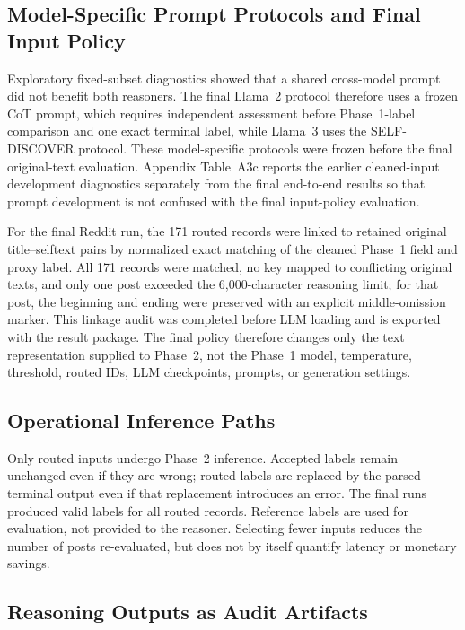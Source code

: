 \documentclass{ieeeaccess}
\begin{document}
\subsection{Model-Specific Prompt Protocols and Final Input Policy}

Exploratory fixed-subset diagnostics showed that a shared cross-model prompt did not benefit both reasoners. The final Llama~2 protocol therefore uses a frozen CoT prompt, which requires independent assessment before Phase~1-label comparison and one exact terminal label, while Llama~3 uses the SELF-DISCOVER protocol. These model-specific protocols were frozen before the final original-text evaluation. Appendix Table~A3c reports the earlier cleaned-input development diagnostics separately from the final end-to-end results so that prompt development is not confused with the final input-policy evaluation.

For the final Reddit run, the 171 routed records were linked to retained original title--selftext pairs by normalized exact matching of the cleaned Phase~1 field and proxy label. All 171 records were matched, no key mapped to conflicting original texts, and only one post exceeded the 6,000-character reasoning limit; for that post, the beginning and ending were preserved with an explicit middle-omission marker. This linkage audit was completed before LLM loading and is exported with the result package. The final policy therefore changes only the text representation supplied to Phase~2, not the Phase~1 model, temperature, threshold, routed IDs, LLM checkpoints, prompts, or generation settings.

\subsection{Operational Inference Paths}

Only routed inputs undergo Phase~2 inference. Accepted labels remain unchanged even if they are wrong; routed labels are replaced by the parsed terminal output even if that replacement introduces an error. The final runs produced valid labels for all routed records. Reference labels are used for evaluation, not provided to the reasoner. Selecting fewer inputs reduces the number of posts re-evaluated, but does not by itself quantify latency or monetary savings.

\subsection{Reasoning Outputs as Audit Artifacts}
\end{document}
